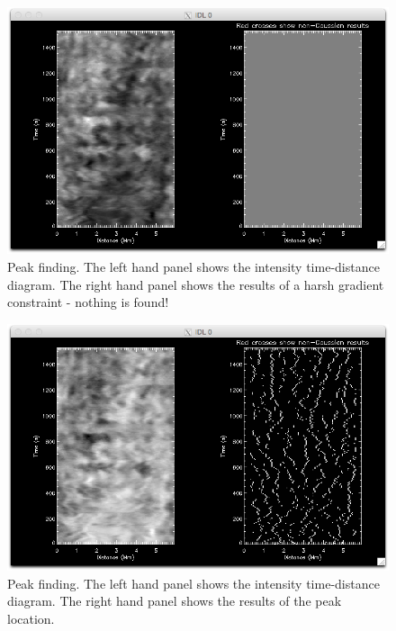 \documentclass{article}
\begin{document}
\begin{figure}[!tp]
\centering

\includegraphics[scale=0.6, clip=true, viewport=0.5cm 0.cm 25.cm 16.7cm]{slit_nothing.png}  

\caption{Peak finding. The left hand panel shows the intensity time-distance diagram. The right hand panel shows the results of a harsh gradient constraint - nothing is found!
}\label{fig:slit_noth}
\end{figure}
\begin{figure}[!tp]
\centering

\includegraphics[scale=0.6, clip=true, viewport=0.5cm 0.cm 25.cm 16.7cm]{slit_nosmooth.png}  

\caption{Peak finding. The left hand panel shows the intensity time-distance diagram. The right hand panel shows the results of the peak location.
}\label{fig:slit_nosm}
\end{figure}
\end{document}

